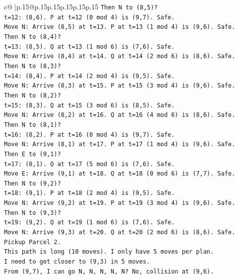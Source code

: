 \documentclass{article}
\begin{document}
{\begin{supertabular}{c@{$\;$}|p{.15\linewidth}@{}p{.15\linewidth}p{.15\linewidth}p{.15\linewidth}p{.15\linewidth}p{.15\linewidth}}
{{{\texttt{Then N to (8,5)?} \\
\texttt{t=12: (8,6). P at t=12 (0 mod 4) is (9,7). Safe.} \\
\texttt{Move N: Arrive (8,5) at t=13. P at t=13 (1 mod 4) is (9,6). Safe.} \\
\texttt{Then N to (8,4)?} \\
\texttt{t=13: (8,5). Q at t=13 (1 mod 6) is (7,6). Safe.} \\
\texttt{Move N: Arrive (8,4) at t=14. Q at t=14 (2 mod 6) is (8,6). Safe.} \\
\texttt{Then N to (8,3)?} \\
\texttt{t=14: (8,4). P at t=14 (2 mod 4) is (9,5). Safe.} \\
\texttt{Move N: Arrive (8,3) at t=15. P at t=15 (3 mod 4) is (9,6). Safe.} \\
\texttt{Then N to (8,2)?} \\
\texttt{t=15: (8,3). Q at t=15 (3 mod 6) is (8,5). Safe.} \\
\texttt{Move N: Arrive (8,2) at t=16. Q at t=16 (4 mod 6) is (8,6). Safe.} \\
\texttt{Then N to (8,1)?} \\
\texttt{t=16: (8,2). P at t=16 (0 mod 4) is (9,7). Safe.} \\
\texttt{Move N: Arrive (8,1) at t=17. P at t=17 (1 mod 4) is (9,6). Safe.} \\
\texttt{Then E to (9,1)?} \\
\texttt{t=17: (8,1). Q at t=17 (5 mod 6) is (7,6). Safe.} \\
\texttt{Move E: Arrive (9,1) at t=18. Q at t=18 (0 mod 6) is (7,7). Safe.} \\
\texttt{Then N to (9,2)?} \\
\texttt{t=18: (9,1). P at t=18 (2 mod 4) is (9,5). Safe.} \\
\texttt{Move N: Arrive (9,2) at t=19. P at t=19 (3 mod 4) is (9,6). Safe.} \\
\texttt{Then N to (9,3)?} \\
\texttt{t=19: (9,2). Q at t=19 (1 mod 6) is (7,6). Safe.} \\
\texttt{Move N: Arrive (9,3) at t=20. Q at t=20 (2 mod 6) is (8,6). Safe.} \\
\texttt{Pickup Parcel 2.} \\
\texttt{This path is long (10 moves). I only have 5 moves per plan.} \\
\texttt{I need to get closer to (9,3) in 5 moves.} \\
\texttt{From (9,7), I can go N, N, N, N, N? No, collision at (9,6).} \\
}}}
\end{supertabular}}
\end{document}
